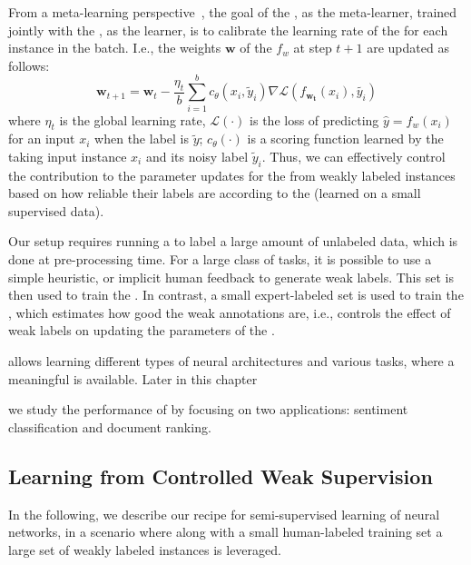From a meta-learning perspective~\citep{Andrychowicz:2016,Finn2017:ICML,Ravi:2016}, the goal of the \cnet, as the meta-learner, trained jointly with the \tnet, as the learner, is to calibrate the learning rate of the \tnet for each instance in the batch. I.e., the weights $\pmb{w}$ of the \tnet $f_w$ at step $t+1$ are updated as follows:
\begin{equation}
\pmb{w}_{t+1} = \pmb{w}_t - \frac{\eta_t}{b}\sum_{i=1}^b c_{\theta}(x_i, \tilde{y}_i)  \nabla \mathcal{L}(f_{\pmb{w_t}}(x_i), \tilde{y_i})
\end{equation}
where $\eta_t$ is the global learning rate, $\mathcal{L}(\cdot)$ is the loss of predicting $\hat{y}=f_w(x_i)$ for an input $x_i$ when the label is $\tilde{y}$; $c_\theta(\cdot)$ is a scoring function learned by the \cnet taking input instance $x_i$ and its noisy label $\tilde{y}_i$. Thus, we can effectively control the contribution to the parameter updates for the \tnet from weakly labeled instances based on how reliable their labels are according to the \cnet (learned on a small supervised data).

Our setup requires running a \wa to label a large amount of unlabeled data, which is done at pre-processing time. For a large class of tasks, it is possible to use a simple heuristic, or implicit human feedback to generate weak labels. This set is then used to train the \tnet.  
In contrast, a small expert-labeled set is used to train the \cnet, which estimates how good the weak annotations are, i.e., controls the effect of weak labels on updating the parameters of the \tnet.

\cws allows learning different types of neural architectures and various tasks, where a meaningful \wa is available. 
Later in this chapter 

we study the performance of \cws by focusing on two applications: sentiment classification and document ranking. 

\subsection{Learning from Controlled Weak Supervision}
\label{sec:method}
In the following, we describe our recipe for semi-supervised learning of neural networks, in a scenario where along with a small human-labeled training set a large set of weakly labeled instances is leveraged.

